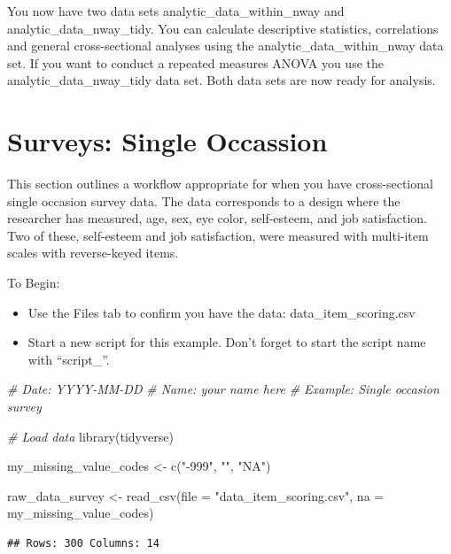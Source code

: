 \documentclass[
]{krantz}
\makeatletter
\newenvironment{Shaded}{\begin{snugshade}}{\end{snugshade}}
\newcommand{\AttributeTok}[1]{\textcolor[rgb]{0.61,0.61,0.61}{#1}}
\newcommand{\CommentTok}[1]{\textcolor[rgb]{0.37,0.37,0.37}{\textit{#1}}}
\newcommand{\FunctionTok}[1]{\textcolor[rgb]{0,0,0}{#1}}
\newcommand{\NormalTok}[1]{#1}
\newcommand{\OtherTok}[1]{\textcolor[rgb]{0.37,0.37,0.37}{#1}}
\newcommand{\StringTok}[1]{\textcolor[rgb]{0.5,0.5,0.5}{#1}}
\newenvironment{kframe}{%
\medskip{}
\setlength{\fboxsep}{.8em}
 \def\at@end@of@kframe{}%
 \ifinner\ifhmode%
  \def\at@end@of@kframe{\end{minipage}}%
  \begin{minipage}{\columnwidth}%
 \fi\fi%
 \def\FrameCommand##1{\hskip\@totalleftmargin \hskip-\fboxsep
 \colorbox{shadecolor}{##1}\hskip-\fboxsep
     \hskip-\linewidth \hskip-\@totalleftmargin \hskip\columnwidth}%
 \MakeFramed {\advance\hsize-\width
   \@totalleftmargin\z@ \linewidth\hsize
   \@setminipage}}%
 {\par\unskip\endMakeFramed%
 \at@end@of@kframe}
\renewenvironment{Shaded}{\begin{kframe}}{\end{kframe}}
\makeatother
\begin{document}
You now have two data sets analytic\_data\_within\_nway and analytic\_data\_nway\_tidy. You can calculate descriptive statistics, correlations and general cross-sectional analyses using the analytic\_data\_within\_nway data set. If you want to conduct a repeated measures ANOVA you use the analytic\_data\_nway\_tidy data set. Both data sets are now ready for analysis.

\hypertarget{surveys-single-occassion}{%
\section{Surveys: Single Occassion}\label{surveys-single-occassion}}

This section outlines a workflow appropriate for when you have cross-sectional single occasion survey data. The data corresponds to a design where the researcher has measured, age, sex, eye color, self-esteem, and job satisfaction. Two of these, self-esteem and job satisfaction, were measured with multi-item scales with reverse-keyed items.

To Begin:

\begin{itemize}
\item
  Use the Files tab to confirm you have the data: data\_item\_scoring.csv
\item
  Start a new script for this example. Don't forget to start the script name with ``script\_''.
\end{itemize}

\begin{Shaded}
\begin{Highlighting}[]
\CommentTok{\# Date: YYYY{-}MM{-}DD}
\CommentTok{\# Name: your name here}
\CommentTok{\# Example: Single occasion survey}

\CommentTok{\# Load data}
\FunctionTok{library}\NormalTok{(tidyverse)}

\NormalTok{my\_missing\_value\_codes }\OtherTok{\textless{}{-}} \FunctionTok{c}\NormalTok{(}\StringTok{"{-}999"}\NormalTok{, }\StringTok{""}\NormalTok{, }\StringTok{"NA"}\NormalTok{)}

\NormalTok{raw\_data\_survey }\OtherTok{\textless{}{-}} \FunctionTok{read\_csv}\NormalTok{(}\AttributeTok{file =} \StringTok{"data\_item\_scoring.csv"}\NormalTok{,}
                     \AttributeTok{na =}\NormalTok{ my\_missing\_value\_codes)}
\end{Highlighting}
\end{Shaded}

\begin{verbatim}
## Rows: 300 Columns: 14
\end{verbatim}
\end{document}
